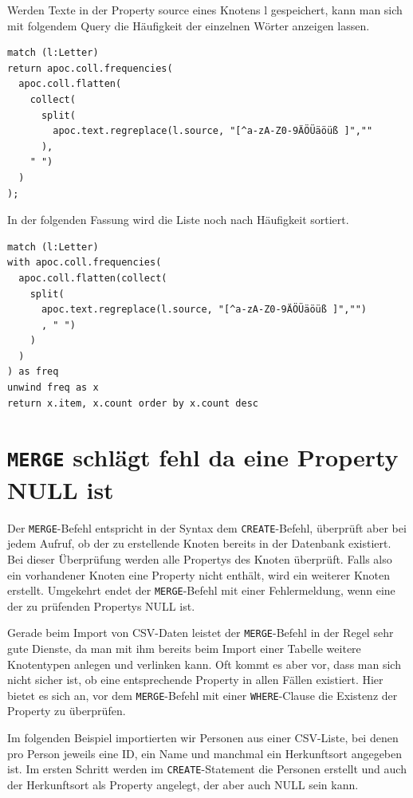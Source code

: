 \documentclass[ngerman,]{scrreprt}
\begin{document}
Werden Texte in der Property source eines Knotens l gespeichert, kann man sich mit folgendem Query die Häufigkeit der einzelnen Wörter anzeigen lassen.

\begin{verbatim}
match (l:Letter)
return apoc.coll.frequencies(
  apoc.coll.flatten(
    collect(
      split(
        apoc.text.regreplace(l.source, "[^a-zA-Z0-9ÄÖÜäöüß ]",""
      ),
    " ")
  )
);
\end{verbatim}

In der folgenden Fassung wird die Liste noch nach Häufigkeit sortiert.

\begin{verbatim}
match (l:Letter)
with apoc.coll.frequencies(
  apoc.coll.flatten(collect(
    split(
      apoc.text.regreplace(l.source, "[^a-zA-Z0-9ÄÖÜäöüß ]","")
      , " ")
    )
  )
) as freq
unwind freq as x
return x.item, x.count order by x.count desc
\end{verbatim}

\section{\texorpdfstring{\texttt{MERGE} schlägt fehl da eine Property NULL ist}{MERGE schlägt fehl da eine Property NULL ist}}\label{merge-schluxe4gt-fehl-da-eine-property-null-ist}

Der \texttt{MERGE}-Befehl entspricht in der Syntax dem \texttt{CREATE}-Befehl, überprüft aber bei jedem Aufruf, ob der zu erstellende Knoten bereits in der Datenbank existiert. Bei dieser Überprüfung werden alle Propertys des Knoten überprüft. Falls also ein vorhandener Knoten eine Property nicht enthält, wird ein weiterer Knoten erstellt. Umgekehrt endet der \texttt{MERGE}-Befehl mit einer Fehlermeldung, wenn eine der zu prüfenden Propertys NULL ist.

Gerade beim Import von CSV-Daten leistet der \texttt{MERGE}-Befehl in der Regel sehr gute Dienste, da man mit ihm bereits beim Import einer Tabelle weitere Knotentypen anlegen und verlinken kann. Oft kommt es aber vor, dass man sich nicht sicher ist, ob eine entsprechende Property in allen Fällen existiert. Hier bietet es sich an, vor dem \texttt{MERGE}-Befehl mit einer \texttt{WHERE}-Clause die Existenz der Property zu überprüfen.

Im folgenden Beispiel importierten wir Personen aus einer CSV-Liste, bei denen pro Person jeweils eine ID, ein Name und manchmal ein Herkunftsort angegeben ist. Im ersten Schritt werden im \texttt{CREATE}-Statement die Personen erstellt und auch der Herkunftsort als Property angelegt, der aber auch NULL sein kann.
\end{document}

